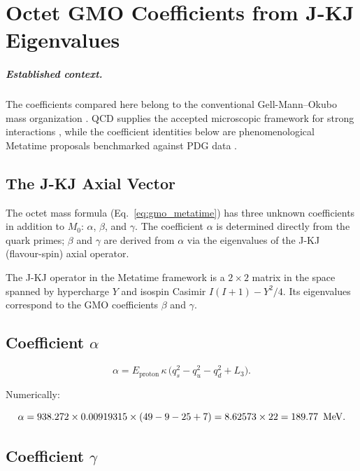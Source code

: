 \chapter{Octet GMO Coefficients from J-KJ Eigenvalues}
\label{ch:octet_coefficients}


\paragraph{Established context.}
The coefficients compared here belong to the conventional Gell-Mann--Okubo mass
organization \cite{GellMann1962,okubo1962}.  QCD supplies the accepted microscopic
framework for strong interactions \cite{GrossWilczek1973,Politzer1973,Wilson1974},
while the coefficient identities below are phenomenological Metatime proposals
benchmarked against PDG data \cite{PDG2024}.

\section{The J-KJ Axial Vector}

The octet mass formula (Eq.~\eqref{eq:gmo_metatime}) has three unknown
coefficients in addition to \(M_0\): \(\alpha\), \(\beta\), and
\(\gamma\).  The coefficient \(\alpha\) is determined directly from the
quark primes; \(\beta\) and \(\gamma\) are derived from \(\alpha\) via
the eigenvalues of the J-KJ (flavour-spin) axial operator.

The J-KJ operator in the Metatime framework is a \(2\times 2\) matrix
in the space spanned by hypercharge \(Y\) and isospin Casimir
\(I(I+1) - Y^2/4\).  Its eigenvalues correspond to the GMO coefficients
\(\beta\) and \(\gamma\).

\section{Coefficient \(\alpha\)}

\begin{equation}
\alpha = E_{\text{proton}}\,\kappa\,
\bigl(q_s^2 - q_u^2 - q_d^2 + L_3\bigr).
\label{eq:alpha}
\end{equation}

Numerically:

\[
\alpha = 938.272 \times 0.00919315 \times (49 - 9 - 25 + 7)
       = 8.62573 \times 22
       = 189.77\ \,\text{MeV}.
\]

\section{Coefficient \(\gamma\)}

